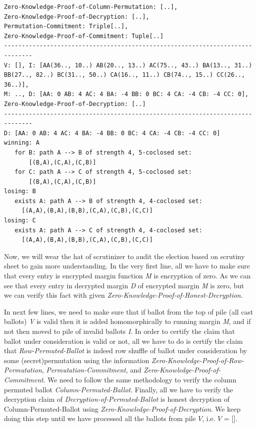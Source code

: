 \documentclass{llncs}
\begin{document}
\begin{lstlisting}[frame=single,basicstyle=\ttfamily\scriptsize]
Zero-Knowledge-Proof-of-Column-Permutation: [..], 
Zero-Knowledge-Proof-of-Decryption: [..], 
Permutation-Commitment: Triple[..], 
Zero-Knowledge-Proof-of-Commitment: Tuple[..]
------------------------------------------------------------------------------
V: [], I: [AA(36.., 10..) AB(20.., 13..) AC(75.., 43..) BA(13.., 31..) 
BB(27.., 82..) BC(31.., 50..) CA(16.., 11..) CB(74.., 15..) CC(26.., 36..)], 
M: .., D: [AA: 0 AB: 4 AC: 4 BA: -4 BB: 0 BC: 4 CA: -4 CB: -4 CC: 0],
Zero-Knowledge-Proof-of-Decryption: [..]
------------------------------------------------------------------------------
D: [AA: 0 AB: 4 AC: 4 BA: -4 BB: 0 BC: 4 CA: -4 CB: -4 CC: 0]
winning: A
   for B: path A --> B of strength 4, 5-coclosed set: 
       [(B,A),(C,A),(C,B)]
   for C: path A --> C of strength 4, 5-coclosed set:
       [(B,A),(C,A),(C,B)] 
losing: B
   exists A: path A --> B of strength 4, 4-coclosed set: 
     [(A,A),(B,A),(B,B),(C,A),(C,B),(C,C)]
losing: C
   exists A: path A --> C of strength 4, 4-coclosed set: 
     [(A,A),(B,A),(B,B),(C,A),(C,B),(C,C)]

\end{lstlisting}


Now, we will wear the hat of scrutinizer to audit the election based on 
 scrutiny sheet to gain more understanding. In the very first line, all we 
 have to make sure that every entry is encrypted margin function \textit{M} 
 is encryption 
 of zero. As we can see that every entry in decrypted margin \textit{D} 
 of encrypted margin \textit{M} is zero, but we can verify this fact with 
 given \textit{Zero-Knowledge-Proof-of-Honest-Decryption}.
 
 In next few lines, we need to make sure that if ballot from the top of 
 pile (all cast ballots) \textit{V} is valid then it is added 
 homomorphically to  running margin \textit{M}, 
 and if not then moved to pile of invalid ballots \textit{I}. In 
 order to certify the claim that ballot under consideration is valid 
 or not, all we have to do is certify the claim that 
 \textit{Row-Permuted-Ballot} 
 is indeed row shuffle of ballot under consideration by 
 some (secret)permutation using the information  
 \textit{Zero-Knowledge-Proof-of-Row-Permutation}, 
 \textit{Permutation-Commitment}, and 
 \textit{Zero-Knowledge-Proof-of-Commitment}. 
 We need to follow the same methodology 
 to verify the column permuted ballot \textit{Column-Permuted-Ballot}. 
 Finally, all we have to verify the decryption claim of 
 \textit{Decryption-of-Permuted-Ballot}
 is honest decryption of Column-Permuted-Ballot using 
 \textit{Zero-Knowledge-Proof-of-Decryption}. We keep doing this 
 step until we have 
 processed all the ballots from pile $V$, i.e. $V$ = []. 
 
\end{document}

